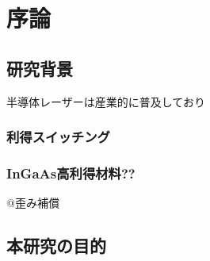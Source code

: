 \chapter{序論}
\section{研究背景}
半導体レーザーは産業的に普及しており
\subsection{利得スイッチング}
\subsection{InGaAs高利得材料??}
@歪み補償




\section{本研究の目的}